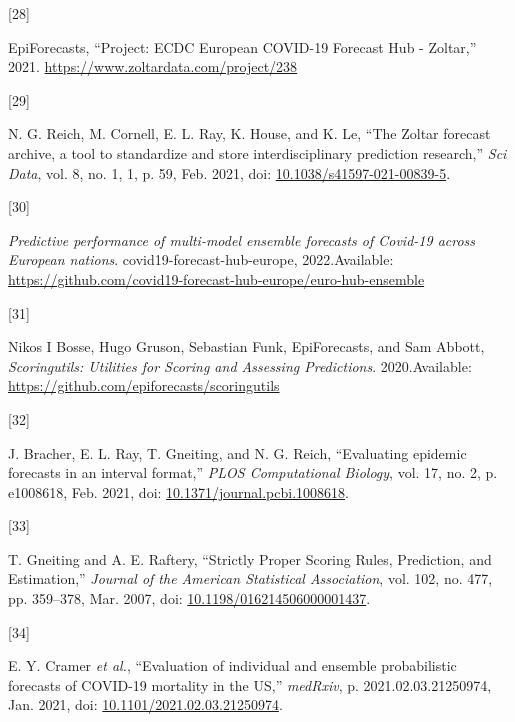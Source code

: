 \documentclass[
]{article}
\newlength{\cslhangindent}
\newlength{\csllabelwidth}
\newlength{\cslentryspacingunit} %
\newenvironment{CSLReferences}[2] %
 {%
  \setlength{\parindent}{0pt}
  \ifodd #1
  \let\oldpar\par
  \def\par{\hangindent=\cslhangindent\oldpar}
  \fi
  \setlength{\parskip}{#2\cslentryspacingunit}
 }%
 {}
\newcommand{\CSLLeftMargin}[1]{\parbox[t]{\csllabelwidth}{#1}}
\newcommand{\CSLRightInline}[1]{\parbox[t]{\linewidth - \csllabelwidth}{#1}\break}
\begin{document}
\begin{CSLReferences}{0}{0}
\leavevmode{}%
\CSLLeftMargin{{[}28{]} }
\CSLRightInline{EpiForecasts, {``Project: {ECDC European COVID-19 Forecast Hub} - {Zoltar},''} 2021. \url{https://www.zoltardata.com/project/238}}

\leavevmode{}%
\CSLLeftMargin{{[}29{]} }
\CSLRightInline{N. G. Reich, M. Cornell, E. L. Ray, K. House, and K. Le, {``The {Zoltar} forecast archive, a tool to standardize and store interdisciplinary prediction research,''} \emph{Sci Data}, vol. 8, no. 1, 1, p. 59, Feb. 2021, doi: \href{https://doi.org/10.1038/s41597-021-00839-5}{10.1038/s41597-021-00839-5}.}

\leavevmode{}%
\CSLLeftMargin{{[}30{]} }
\CSLRightInline{\emph{Predictive performance of multi-model ensemble forecasts of {Covid-19} across {European} nations}. {covid19-forecast-hub-europe}, 2022.Available: \url{https://github.com/covid19-forecast-hub-europe/euro-hub-ensemble}}

\leavevmode{}%
\CSLLeftMargin{{[}31{]} }
\CSLRightInline{Nikos I Bosse, Hugo Gruson, Sebastian Funk, EpiForecasts, and Sam Abbott, \emph{Scoringutils: {Utilities} for {Scoring} and {Assessing Predictions}}. 2020.Available: \url{https://github.com/epiforecasts/scoringutils}}

\leavevmode{}%
\CSLLeftMargin{{[}32{]} }
\CSLRightInline{J. Bracher, E. L. Ray, T. Gneiting, and N. G. Reich, {``Evaluating epidemic forecasts in an interval format,''} \emph{PLOS Computational Biology}, vol. 17, no. 2, p. e1008618, Feb. 2021, doi: \href{https://doi.org/10.1371/journal.pcbi.1008618}{10.1371/journal.pcbi.1008618}.}

\leavevmode{}%
\CSLLeftMargin{{[}33{]} }
\CSLRightInline{T. Gneiting and A. E. Raftery, {``Strictly {Proper Scoring Rules}, {Prediction}, and {Estimation},''} \emph{Journal of the American Statistical Association}, vol. 102, no. 477, pp. 359--378, Mar. 2007, doi: \href{https://doi.org/10.1198/016214506000001437}{10.1198/016214506000001437}.}

\leavevmode{}%
\CSLLeftMargin{{[}34{]} }
\CSLRightInline{E. Y. Cramer \emph{et al.}, {``Evaluation of individual and ensemble probabilistic forecasts of {COVID-19} mortality in the {US},''} \emph{medRxiv}, p. 2021.02.03.21250974, Jan. 2021, doi: \href{https://doi.org/10.1101/2021.02.03.21250974}{10.1101/2021.02.03.21250974}.}


\end{CSLReferences}
\end{document}
